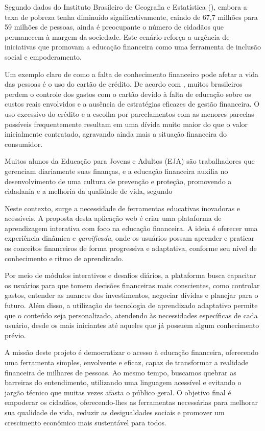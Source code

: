 \documentclass[
	article,			%
	12pt,				%
	oneside,			%
	a4paper,			%
	english,			%
	brazil,				%
	sumario=tradicional
	]{abntex2}
\begin{document}
Segundo dados do Instituto Brasileiro de Geografia e Estatística (), embora a taxa de pobreza tenha diminuído significativamente, caindo de 67,7 milhões para 59 milhões de pessoas, ainda é preocupante o número de cidadãos que permanecem à margem da sociedade. Este cenário reforça a urgência de iniciativas que promovam a educação financeira como uma ferramenta de inclusão social e empoderamento.

Um exemplo claro de como a falta de conhecimento financeiro pode afetar a vida das pessoas é o uso do cartão de crédito. De acordo com , muitos brasileiros perdem o controle dos gastos com o cartão devido à falta de educação sobre os custos reais envolvidos e a ausência de estratégias eficazes de gestão financeira. O uso excessivo do crédito e a escolha por parcelamentos com as menores parcelas possíveis frequentemente resultam em uma dívida muito maior do que o valor inicialmente contratado, agravando ainda mais a situação financeira do consumidor.

Muitos alunos da Educação para Jovens e Adultos (EJA) são trabalhadores que gerenciam diariamente suas finanças, e a educação financeira auxilia no desenvolvimento de uma cultura de prevenção e proteção, promovendo a cidadania e a melhoria da qualidade de vida, segundo 

Neste contexto, surge a necessidade de ferramentas educativas inovadoras e acessíveis. A proposta desta aplicação web é criar uma plataforma de aprendizagem interativa com foco na educação financeira. A ideia é oferecer uma experiência dinâmica e \textit{gamificada}, onde os usuários possam aprender e praticar os conceitos financeiros de forma progressiva e adaptativa, conforme seu nível de conhecimento e ritmo de aprendizado. 

Por meio de módulos interativos e desafios diários, a plataforma busca capacitar os usuários para que tomem decisões financeiras mais conscientes, como controlar gastos, entender as nuances dos investimentos, negociar dívidas e planejar para o futuro. Além disso, a utilização de tecnologia de aprendizado adaptativo permite que o conteúdo seja personalizado, atendendo às necessidades específicas de cada usuário, desde os mais iniciantes até aqueles que já possuem algum conhecimento prévio.

A missão deste projeto é democratizar o acesso à educação financeira, oferecendo uma ferramenta simples, envolvente e eficaz, capaz de transformar a realidade financeira de milhares de pessoas. Ao mesmo tempo, buscamos quebrar as barreiras do entendimento, utilizando uma linguagem acessível e evitando o jargão técnico que muitas vezes afasta o público geral. O objetivo final é empoderar os cidadãos, oferecendo-lhes as ferramentas necessárias para melhorar sua qualidade de vida, reduzir as desigualdades sociais e promover um crescimento econômico mais sustentável para todos.
\end{document}
